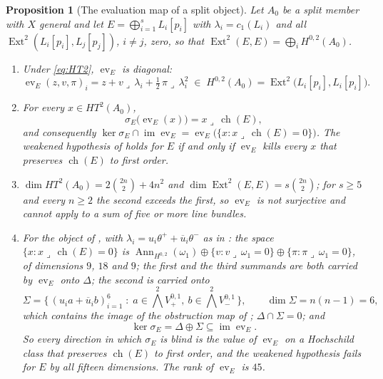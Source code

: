 \documentclass[11pt,reqno]{amsart}
\theoremstyle{plain}
\newtheorem{proposition}[theorem]{Proposition}
\theoremstyle{definition}
\theoremstyle{remark}
\DeclareMathOperator{\ch}{ch}
\DeclareMathOperator{\Ext}{Ext}
\DeclareMathOperator{\image}{im}
\DeclareMathOperator{\Ann}{Ann}
\newcommand{\bbar}[1]{\overline{#1}}
\begin{document}
\begin{proposition}[The evaluation map of a split object]\label{prop:evaluation}
Let $A_{0}$ be a split member with $X$ general and let
$E=\bigoplus_{i=1}^{s}L_{i}[p_{i}]$ with $\lambda_{i}=c_{1}(L_{i})$ and all
$\Ext^{2}(L_{i}[p_{i}],L_{j}[p_{j}])$, $i\ne j$, zero, so that
$\Ext^{2}(E,E)=\bigoplus_{i}H^{0,2}(A_{0})$.
\begin{enumerate}[label=\textup{(\roman*)},nosep]
\item Under \eqref{eq:HT2}, $\operatorname{ev}_{E}$ is diagonal:
  \begin{equation}\label{eq:evsplit}
    \operatorname{ev}_{E}(z,v,\pi)_{i}
    =z+v\lrcorner\,\lambda_{i}+\tfrac12\,\pi\lrcorner\,\lambda_{i}^{2}
    \;\in\;H^{0,2}(A_{0})=\Ext^{2}\bigl(L_{i}[p_{i}],L_{i}[p_{i}]\bigr).
  \end{equation}
\item For every $x\in HT^{2}(A_{0})$,
  \begin{equation}\label{eq:sigmaev}
    \sigma_{E}\bigl(\operatorname{ev}_{E}(x)\bigr)=x\lrcorner\,\ch(E),
  \end{equation}
  and consequently
  $\ker\sigma_{E}\cap\image\operatorname{ev}_{E}
   =\operatorname{ev}_{E}\bigl(\{x:x\lrcorner\,\ch(E)=0\}\bigr)$.
  The weakened hypothesis of \cite[Question 11.4]{Mar25b} holds for $E$ if
  and only if $\operatorname{ev}_{E}$ kills every $x$ that preserves
  $\ch(E)$ to first order.
\item $\dim HT^{2}(A_{0})=2\binom{2n}{2}+4n^{2}$ and
  $\dim\Ext^{2}(E,E)=s\binom{2n}{2}$; for $s\ge5$ and every $n\ge2$ the
  second exceeds the first, so $\operatorname{ev}_{E}$ is not surjective and
  \cite[Lemma 11.3]{Mar25b} cannot apply to a sum of five or more line
  bundles.
\item For the object of , with
  $\lambda_{i}=u_{i}\theta^{+}+\bbar u_{i}\theta^{-}$ as in
  : the space $\{x:x\lrcorner\,\ch(E)=0\}$ is
  $\Ann_{H^{0,2}}(\omega_{1})\oplus\{v:v\lrcorner\,\omega_{1}=0\}\oplus
  \{\pi:\pi\lrcorner\,\omega_{1}=0\}$, of dimensions $9$, $18$ and $9$; the
  first and the third summands are both carried by $\operatorname{ev}_{E}$
  onto $\Delta$; the second is carried onto
  \[
    \Sigma=\bigl\{\,(u_{i}a+\bbar u_{i}b)_{i=1}^{6}\;:\;
      a\in\textstyle\bigwedge^{2}V_{+}^{0,1},\ b\in\bigwedge^{2}V_{-}^{0,1}\,\bigr\},
    \qquad \dim\Sigma=n(n-1)=6,
  \]
  which contains the image of the obstruction map of
  ; $\Delta\cap\Sigma=0$; and
  \[
    \ker\sigma_{E}=\Delta\oplus\Sigma\subseteq\image\operatorname{ev}_{E}.
  \]
  So every direction in which $\sigma_{E}$ is blind is the value of
  $\operatorname{ev}_{E}$ on a Hochschild class that preserves $\ch(E)$ to
  first order, and the weakened hypothesis fails for $E$ by all fifteen
  dimensions. The rank of $\operatorname{ev}_{E}$ is $45$.
\end{enumerate}
\end{proposition}
\end{document}
